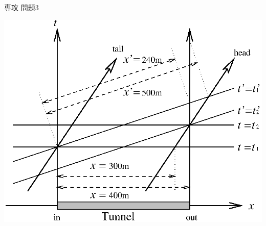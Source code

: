 \documentclass[fleqn]{jbook}
\begin{document}
\begin{answer}{専攻 問題3}{}
\begin{subanswers}
\begin{subsubanswers}
    \begin{center}
      \mbox{\includegraphics[clip]{1996phy3-1.eps}}
    \end{center}

  \end{subsubanswers}

\end{subanswers}

\end{answer}
\end{document}
